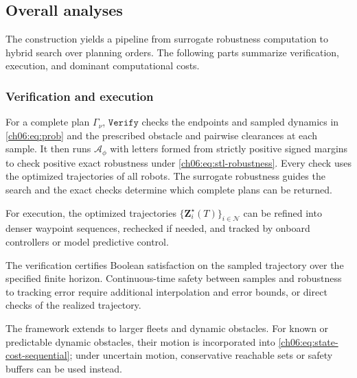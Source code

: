 \subsection{Overall analyses}
\label{ch06:subsec:overall}

The construction yields a pipeline from surrogate robustness computation to
hybrid search over planning orders. The following parts summarize verification,
execution, and dominant computational costs.

\subsubsection{Verification and execution}
\label{ch06:subsubsec:execute}

\begin{revision}
For a complete plan $\Gamma_\nu$, $\texttt{Verify}$ checks the endpoints
and sampled dynamics in \eqref{ch06:eq:prob} and the prescribed obstacle and
pairwise clearances at each sample. It then runs $\mathcal{A}_\phi$ with
letters formed from strictly positive signed margins to check positive
exact robustness under \eqref{ch06:eq:stl-robustness}. Every check uses
the optimized trajectories of all robots. The surrogate robustness guides the search and the exact
checks determine which complete plans can be returned.
\end{revision}
For execution, the optimized trajectories
$\{\mathbf{Z}_i^\star(T)\}_{i\in\mathcal{N}}$ can be refined into denser
waypoint sequences, rechecked if needed, and tracked by onboard controllers or
model predictive control.

\begin{revision}
The verification certifies Boolean satisfaction on the sampled trajectory
over the specified finite horizon.
Continuous-time safety between samples and robustness to tracking error
require additional interpolation and error bounds, or direct checks of
the realized trajectory.
\end{revision}
The framework extends to larger fleets and dynamic obstacles.  For known or
predictable dynamic obstacles, their motion is incorporated into
\eqref{ch06:eq:state-cost-sequential}; under uncertain motion, conservative
reachable sets or safety buffers can be used instead.

